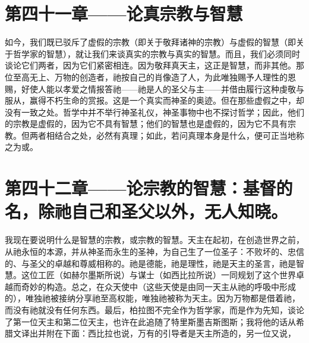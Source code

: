 
\section{第四十一章——论真宗教与智慧}

如今，我们既已驳斥了虚假的宗教（即关于敬拜诸神的宗教）与虚假的智慧（即关于哲学家的智慧），就让我们来谈真实的宗教与真实的智慧。而且，我们必须同时谈论它们两者，因为它们紧密相连。因为敬拜真天主，这正是智慧，而非其他。那位至高无上、万物的创造者，祂按自己的肖像造了人，为此唯独赐予人理性的恩赐，好使人能以孝爱之情报答祂——祂是人的圣父与主——并借由履行这种虔敬与服从，赢得不朽生命的赏报。这是一个真实而神圣的奥迹。但在那些虚假之中，却没有一致之处。哲学中并不举行神圣礼仪，神圣事物中也不探讨哲学；因此，他们的宗教是虚假的，因为它不具有智慧；他们的智慧也是虚假的，因为它不具有宗教。但两者相结合之处，必然有真理；如此，若问真理本身是什么，便可正当地称之为或。\par


\section{第四十二章——论宗教的智慧：基督的名，除祂自己和圣父以外，无人知晓。}

我现在要说明什么是智慧的宗教，或宗教的智慧。天主在起初，在创造世界之前，从祂永恒的本源，并从神圣而永生的圣神，为自己生了一位圣子：不败坏的、忠信的、与圣父的卓越和尊威相称的。祂是德能，祂是理性，祂是天主的圣言，祂是智慧。这位工匠（如赫尔墨斯所说）与谋士（如西比拉所说）一同规划了这个世界卓越而奇妙的构造。总之，在众天使中（这些天使是由同一天主从祂的呼吸中形成的），唯独祂被接纳分享祂至高权能，唯独祂被称为天主。因为万物都是借着祂，而没有祂就没有任何东西。最后，柏拉图不完全作为哲学家，而是作为先知，谈论了第一位天主和第二位天主，也许在此追随了特里斯墨吉斯图斯；我将他的话从希腊文译出并附在下面：西比拉也说，万有的引导者是天主所造的，另一位又说，\par

\par

